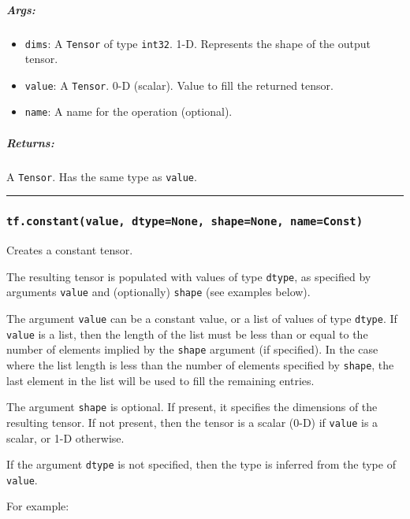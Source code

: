 \subparagraph{Args: }\label{args-4}

\begin{itemize}
\tightlist
\item
  \texttt{dims}: A \texttt{Tensor} of type \texttt{int32}. 1-D.
  Represents the shape of the output tensor.
\item
  \texttt{value}: A \texttt{Tensor}. 0-D (scalar). Value to fill the
  returned tensor.
\item
  \texttt{name}: A name for the operation (optional).
\end{itemize}

\subparagraph{Returns: }\label{returns-4}

A \texttt{Tensor}. Has the same type as \texttt{value}.

\begin{center}\rule{0.5\linewidth}{\linethickness}\end{center}

\subsubsection{\texorpdfstring{\texttt{tf.constant(value,\ dtype=None,\ shape=None,\ name=\textquotesingle{}Const\textquotesingle{})}
}{tf.constant(value, dtype=None, shape=None, name='Const') }}\label{tf.constantvalue-dtypenone-shapenone-nameconst}

Creates a constant tensor.

The resulting tensor is populated with values of type \texttt{dtype}, as
specified by arguments \texttt{value} and (optionally) \texttt{shape}
(see examples below).

The argument \texttt{value} can be a constant value, or a list of values
of type \texttt{dtype}. If \texttt{value} is a list, then the length of
the list must be less than or equal to the number of elements implied by
the \texttt{shape} argument (if specified). In the case where the list
length is less than the number of elements specified by \texttt{shape},
the last element in the list will be used to fill the remaining entries.

The argument \texttt{shape} is optional. If present, it specifies the
dimensions of the resulting tensor. If not present, then the tensor is a
scalar (0-D) if \texttt{value} is a scalar, or 1-D otherwise.

If the argument \texttt{dtype} is not specified, then the type is
inferred from the type of \texttt{value}.

For example:

